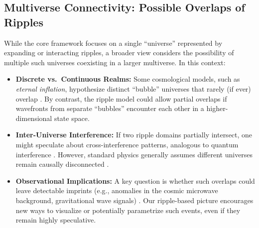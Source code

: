 \documentclass{article}
\begin{document}
\subsection{Multiverse Connectivity: Possible Overlaps of Ripples}
\label{subsec:multiverse-ripples}
While the core framework focuses on a single “universe” represented by 
expanding or interacting ripples, a broader view considers the possibility 
of multiple such universes coexisting in a larger multiverse. In this context:
\begin{itemize}
  \item \textbf{Discrete vs.\ Continuous Realms:} Some cosmological models, 
        such as \emph{eternal inflation}, hypothesize distinct “bubble” universes 
        that rarely (if ever) overlap \cite{Guth1981, Linde1983}. By contrast, 
        the ripple model could allow partial overlaps if wavefronts from 
        separate “bubbles” encounter each other in a higher-dimensional state space.
  \item \textbf{Inter-Universe Interference:} If two ripple domains 
        partially intersect, one might speculate about cross-interference 
        patterns, analogous to quantum interference \cite{everett1957, dewitt1971}. 
        However, standard physics generally assumes different universes remain 
        causally disconnected \cite{misner1973, penrose2004}.
  \item \textbf{Observational Implications:} A key question is whether 
        such overlaps could leave detectable imprints (e.g., anomalies 
        in the cosmic microwave background, gravitational wave signals) 
        \cite{hawking1988, susskind2008}. Our ripple-based picture 
        encourages new ways to visualize or potentially parametrize such 
        events, even if they remain highly speculative.
\end{itemize}
\end{document}
